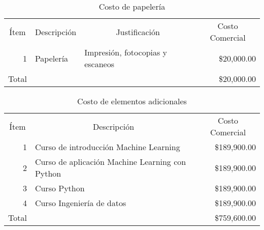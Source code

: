 \begin{table}[H]
    \centering
    \caption{Costo de papelería}
    \footnotesize
    \begin{tabular}{crrr}
        \hline
        Ítem & \multicolumn{1}{c}{Descripción} & \multicolumn{1}{c}{Justificación} & \multicolumn{1}{c}{Costo Comercial} \bigstrut\\
        \cline{2-4}\multicolumn{1}{r}{1} & \multicolumn{1}{l}{Papelería} & \multicolumn{1}{l}{Impresión, fotocopias y escaneos} & \$20,000.00  \bigstrut\\
        \cline{2-4}Total &   &   & \$20,000.00  \bigstrut\\
        \hline
    \end{tabular}%
  \label{tab:papeleria}%
\end{table}%

\begin{table}[H]
    \centering
    \caption{Costo de elementos adicionales}
    \footnotesize
    \begin{tabular}{crr}
        \hline
        Ítem & \multicolumn{1}{c}{Descripción} & \multicolumn{1}{c}{Costo Comercial} \bigstrut\\
    \cline{2-3}    \multicolumn{1}{r}{1} & \multicolumn{1}{l}{Curso de introducción Machine Learning} & \$189,900.00  \bigstrut[t]\\
        \multicolumn{1}{r}{2} & \multicolumn{1}{l}{Curso de aplicación Machine Learning con Python} & \$189,900.00  \\
        \multicolumn{1}{r}{3} & \multicolumn{1}{l}{Curso Python} & \$189,900.00  \\
        \multicolumn{1}{r}{4} & \multicolumn{1}{l}{Curso Ingeniería de datos} & \$189,900.00  \bigstrut[b]\\
    \cline{2-3}    Total &   & \$759,600.00  \bigstrut\\
        \hline
    \end{tabular}%
  \label{tab:otros}%
\end{table}%
